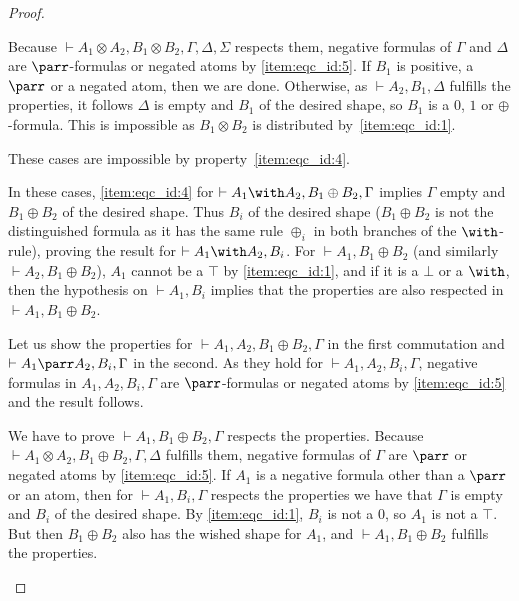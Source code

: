 \documentclass{lmcs}
\newcommand*{\tens}{\otimes} %
\renewcommand*{\fCenter}{\vdash} %
\newcommand{\comm}[2]{C_{#1}^{#2}} %
\begin{document}
\begin{proof}
\begin{description}
Because ${\fCenter A_1\tens A_2,B_1\tens B_2,\Gamma,\Delta,\Sigma}$ respects them, negative formulas of $\Gamma$ and $\Delta$ are $\parr$-formulas or negated atoms by \ref{item:eqc_id:5}.
If $B_1$ is positive, a $\parr$ or a negated atom, then we are done.
Otherwise, as $\fCenter A_2,B_1,\Delta$ fulfills the properties, it follows $\Delta$ is empty and $B_1$ of the desired shape, so $B_1$ is a $0$, $1$ or $\oplus$-formula.
This is impossible as $B_1\tens B_2$ is distributed by~\ref{item:eqc_id:1}.
\item[$\comm{\with}{\with}$, $\comm{\parr}{\with}$, $\comm{\with}{\parr}$, $\comm{\tens}{\with}$ and $\comm{\with}{\tens}$ commutations]
These cases are impossible by property~\ref{item:eqc_id:4}.
\item[$\comm{\oplus_i}{\with}$ and $\comm{\with}{\oplus_i}$ commutations]
In these cases, \ref{item:eqc_id:4} for $\fCenter A_1\with A_2,B_1\oplus B_2,\Gamma$ implies $\Gamma$ empty and $B_1\oplus B_2$ of the desired shape.
Thus $B_i$ of the desired shape ($B_1\oplus B_2$ is not the distinguished formula as it has the same rule $\oplus_i$ in both branches of the $\with$-rule), proving the result for $\fCenter A_1\with A_2,B_i$.
For $\fCenter A_1, B_1\oplus B_2$ (and similarly $\fCenter A_2, B_1\oplus B_2$), $A_1$ cannot be a $\top$ by \ref{item:eqc_id:1}, and if it is a $\bot$ or a $\with$, then the hypothesis on $\fCenter A_1, B_i$ implies that the properties are also respected in $\fCenter A_1, B_1\oplus B_2$.
\item[$\comm{\oplus_i}{\parr}$ and $\comm{\parr}{\oplus_i}$ commutations]
Let us show the properties for $\fCenter A_1,A_2,B_1\oplus B_2,\Gamma$ in the first commutation and $\fCenter A_1\parr A_2,B_i,\Gamma$ in the second.
As they hold for $\fCenter A_1, A_2, B_i,\Gamma$, negative formulas in $A_1, A_2, B_i,\Gamma$ are $\parr$-formulas or negated atoms by \ref{item:eqc_id:5} and the result follows.
\item[$\comm{\oplus_i}{\tens}$ commutation]
We have to prove $\fCenter A_1,B_1\oplus B_2,\Gamma$ respects the properties.
Because $\fCenter A_1\tens A_2,B_1\oplus B_2,\Gamma,\Delta$ fulfills them, negative formulas of $\Gamma$ are $\parr$ or negated atoms by \ref{item:eqc_id:5}.
If $A_1$ is a negative formula other than a $\parr$ or an atom, then for $\fCenter A_1,B_i,\Gamma$ respects the properties we have that $\Gamma$ is empty and $B_i$ of the desired shape.
By \ref{item:eqc_id:1}, $B_i$ is not a $0$, so $A_1$ is not a $\top$.
But then $B_1\oplus B_2$ also has the wished shape for $A_1$, and $\fCenter A_1,B_1\oplus B_2$ fulfills the properties.

\end{description}
\end{proof}
\end{document}
